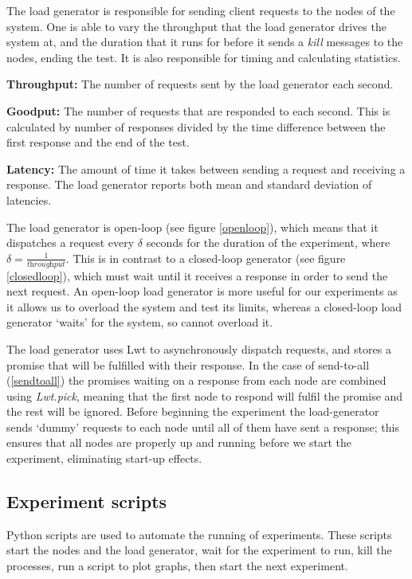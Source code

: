 The load generator is responsible for sending client requests to the nodes of the system. One is able to vary the throughput that the load generator drives the system at, and the duration that it runs for before it sends a \textit{kill} messages to the nodes, ending the test. It is also responsible for timing and calculating statistics.

\textbf{Throughput: } The number of requests sent by the load generator each second.

\textbf{Goodput: } The number of requests that are responded to each second. This is calculated by number of responses divided by the time difference between the first response and the end of the test.

\textbf{Latency: } The amount of time it takes between sending a request and receiving a response. The load generator reports both mean and standard deviation of latencies.

The load generator is open-loop (see figure \ref{openloop}), which means that it dispatches a request every $\delta$ seconds for the duration of the experiment, where $\delta = \frac{1}{\textit{throughput}}$. This is in contrast to a closed-loop generator (see figure \ref{closedloop}), which must wait until it receives a response in order to send the next request. An open-loop load generator is more useful for our experiments as it allows us to overload the system and test its limits, whereas a closed-loop load generator `waits' for the system, so cannot overload it.

The load generator uses Lwt to asynchronously dispatch requests, and stores a promise that will be fulfilled with their response. In the case of send-to-all (\ref{sendtoall}) the promises waiting on a response from each node are combined using \textit{Lwt.pick}, meaning that the first node to respond will fulfil the promise and the rest will be ignored. Before beginning the experiment the load-generator sends `dummy' requests to each node until all of them have sent a response; this ensures that all nodes are properly up and running before we start the experiment, eliminating start-up effects.

\subsection{Experiment scripts} \label{experimentscripts}
Python scripts are used to automate the running of experiments. These scripts start the nodes and the load generator, wait for the experiment to run, kill the processes, run a script to plot graphs, then start the next experiment.

